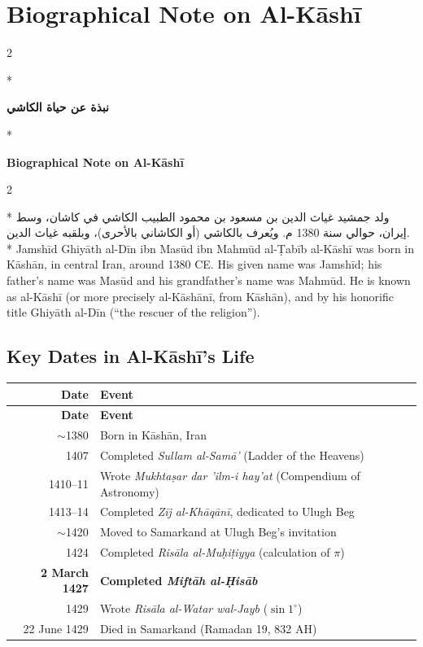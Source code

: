 \documentclass[11pt,a4paper]{article}
\newcommand{\ar}[1]{\arabicfont\beginR #1\endR}
\newenvironment{bilingual}{%
  \vspace{0.3em}%
  \begin{paracol}{2}%
}{%
  \end{paracol}%
  \vspace{0.3em}%
}
\begin{document}
\appendix
\section{Biographical Note on Al-K\=ash\=i}
\label{app:biography}

\begin{bilingual}
\switchcolumn[0]*
\begin{center}
\textbf{\Large\color{chapcolor}\ar{نبذة عن حياة الكاشي}}
\end{center}
\switchcolumn[1]*
\begin{center}
\textbf{\Large\color{chapcolor}Biographical Note on Al-K\=ash\=i}
\end{center}
\end{bilingual}

\begin{bilingual}
\switchcolumn[0]*
\ar{ولد جمشيد غياث الدين بن مسعود بن محمود الطبيب الكاشي في كاشان، وسط إيران، حوالي سنة 1380 م. ويُعرف بالكاشي (أو الكاشاني بالأحرى)، وبلقبه غياث الدين.}
\switchcolumn[1]*
Jamsh\=id Ghiy\=ath al-D\=in ibn Mas\=ud ibn Mahm\=ud al-\d{T}ab\=ib al-K\=ash\=i was
born in K\=ash\=an, in central Iran, around 1380 CE. His given name was
Jamsh\=id; his father's name was Mas\=ud and his grandfather's name was
Mahm\=ud. He is known as al-K\=ash\=i (or more precisely al-K\=ash\=an\=i, from
K\=ash\=an), and by his honorific title Ghiy\=ath al-D\=in (``the rescuer of
the religion'').
\end{bilingual}

\subsection{Key Dates in Al-K\=ash\=i's Life}

\begin{longtable}{|r|l|}
\hline
\textbf{Date} & \textbf{Event} \\
\hline
\endfirsthead
\hline
\textbf{Date} & \textbf{Event} \\
\hline
\endhead
$\sim$1380 & Born in K\=ash\=an, Iran \\
\hline
1407 & Completed \textit{Sullam al-Sam\=a'} (Ladder of the Heavens) \\
\hline
1410--11 & Wrote \textit{Mukhta\d{s}ar dar 'ilm-i hay'at} (Compendium of
Astronomy) \\
\hline
1413--14 & Completed \textit{Z\=ij al-Kh\=aq\=an\=i}, dedicated to Ulugh Beg \\
\hline
$\sim$1420 & Moved to Samarkand at Ulugh Beg's invitation \\
\hline
1424 & Completed \textit{Ris\=ala al-Mu\d{h}i\d{t}iyya} (calculation of $\pi$)
\\
\hline
\textbf{2 March 1427} & \textbf{Completed \textit{Mift\=ah al-\d{H}is\=ab}} \\
\hline
1429 & Wrote \textit{Ris\=ala al-Watar wal-Jayb} ($\sin 1^\circ$) \\
\hline
22 June 1429 & Died in Samarkand (Ramadan 19, 832 AH) \\
\hline
\end{longtable}
\end{document}
